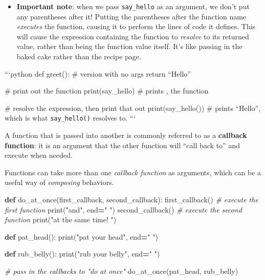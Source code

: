 \documentclass[]{book}
\newenvironment{Shaded}{\begin{snugshade}}{\end{snugshade}}
\newcommand{\KeywordTok}[1]{\textcolor[rgb]{0.13,0.29,0.53}{\textbf{#1}}}
\newcommand{\StringTok}[1]{\textcolor[rgb]{0.31,0.60,0.02}{#1}}
\newcommand{\CommentTok}[1]{\textcolor[rgb]{0.56,0.35,0.01}{\textit{#1}}}
\newcommand{\OperatorTok}[1]{\textcolor[rgb]{0.81,0.36,0.00}{\textbf{#1}}}
\newcommand{\BuiltInTok}[1]{#1}
\newcommand{\NormalTok}[1]{#1}
\providecommand{\tightlist}{%
  \setlength{\itemsep}{0pt}\setlength{\parskip}{0pt}}
\begin{document}
\begin{itemize}
\tightlist
\item
  \textbf{Important note}: when we pass \texttt{say\_hello} as an
  argument, we don't put any parentheses after it! Putting the
  parentheses after the function name \emph{executes} the function,
  causing it to perform the lines of code it defines. This will cause
  the expression containing the function to \emph{resolve} to its
  returned value, rather than being the function value itself. It's like
  passing in the baked cake rather than the recipe page.
\end{itemize}

```python def greet(): \# version with no args return ``Hello''

\# print out the function print(say\_hello) \# prints , the function

\# resolve the expression, then print that out print(say\_hello()) \#
prints ``Hello'', which is what \texttt{say\_hello()} resolves to. ```

A function that is passed into another is commonly referred to as a
\textbf{callback function}: it is an argument that the other function
will ``call back to'' and execute when needed.

Functions can take more than one \emph{callback function} as arguments,
which can be a useful way of \emph{composing} behaviors.

\begin{Shaded}
\begin{Highlighting}[]
\KeywordTok{def}\NormalTok{ do_at_once(first_callback, second_callback):}
\NormalTok{    first_callback()  }\CommentTok{# execute the first function}
    \BuiltInTok{print}\NormalTok{(}\StringTok{"and"}\NormalTok{, end}\OperatorTok{=}\StringTok{" "}\NormalTok{)}
\NormalTok{    second_callback()  }\CommentTok{# execute the second function}
    \BuiltInTok{print}\NormalTok{(}\StringTok{"at the same time! "}\NormalTok{)}

\KeywordTok{def}\NormalTok{ pat_head():}
    \BuiltInTok{print}\NormalTok{(}\StringTok{"pat your head"}\NormalTok{, end}\OperatorTok{=}\StringTok{" "}\NormalTok{)}

\KeywordTok{def}\NormalTok{ rub_belly():}
    \BuiltInTok{print}\NormalTok{(}\StringTok{"rub your belly"}\NormalTok{, end}\OperatorTok{=}\StringTok{" "}\NormalTok{)}

\CommentTok{# pass in the callbacks to "do at once"}
\NormalTok{do_at_once(pat_head, rub_belly)}
\end{Highlighting}
\end{Shaded}
\end{document}
